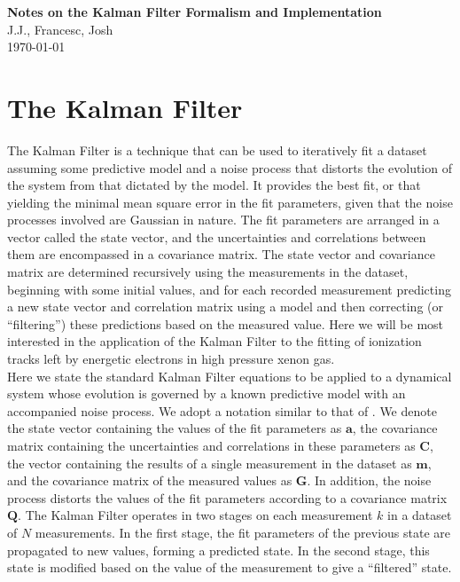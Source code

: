 \documentclass[10pt]{article}
\begin{document}
{\noindent\Large\textbf{Notes on the Kalman Filter Formalism and Implementation}}\\
J.J., Francesc, Josh\\
\today

\section{The Kalman Filter}
\noindent The Kalman Filter is a technique that can be used to iteratively fit a dataset assuming some predictive model and a noise process that distorts
the evolution of the system from that dictated by the model.  It provides the best fit, or
that yielding the minimal mean square error in the fit parameters, given that the noise processes involved are Gaussian in nature.  The fit parameters
are arranged in a vector called the state vector, and the uncertainties and correlations between them are encompassed in a covariance matrix.  The
state vector and covariance matrix are determined recursively using the measurements in the dataset, beginning with some initial values, and for each 
recorded measurement predicting a new state vector and correlation matrix using a model and then correcting (or ``filtering'') these predictions based 
on the measured value.  Here we will be most interested in the application of the Kalman Filter to the fitting of ionization tracks left by energetic
electrons in high pressure xenon gas.\\

\noindent Here we state the standard Kalman Filter equations to be applied to a dynamical system whose evolution is governed by a known predictive model
with an accompanied noise process.  We adopt a notation similar to that of \cite{Wolin_1993}.  We denote the state vector 
containing the values of the fit parameters as $\mathbf{a}$, the covariance matrix containing the uncertainties and correlations in these parameters
as $\mathbf{C}$, the vector containing the results of a single measurement in the dataset as $\mathbf{m}$, and the covariance matrix of the measured values
as $\mathbf{G}$.  In addition, the noise process distorts the values of the fit parameters according to a covariance matrix $\mathbf{Q}$.  The Kalman Filter
operates in two stages on each measurement $k$ in a dataset of $N$ measurements.  In the first stage, the fit parameters of the previous state are 
propagated to new values, forming a predicted state.  In the second stage, this state is modified based on the value of the measurement to give
a ``filtered'' state.\\
\end{document}
